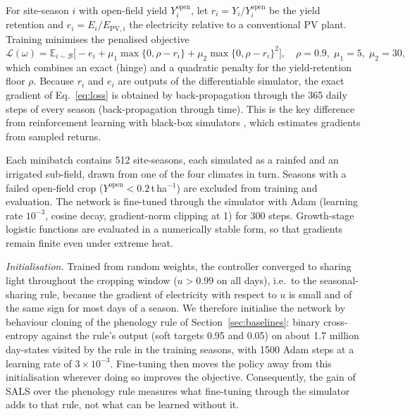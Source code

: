 For site-season $i$ with open-field yield $Y^{\mathrm{open}}_i$, let $r_i=Y_i/Y^{\mathrm{open}}_i$ be the yield retention and $e_i=E_i/E_{\mathrm{PV},i}$ the electricity relative to a conventional PV plant. Training minimises the penalised objective
\begin{equation}
\mathcal{L}(\omega)=\mathbb{E}_{i\sim\mathcal{B}}\Big[-e_i+\mu_1\max\{0,\rho-r_i\}+\mu_2\max\{0,\rho-r_i\}^2\Big],\quad \rho=0.9,\;\mu_1=5,\;\mu_2=30,
\label{eq:loss}
\end{equation}
which combines an exact (hinge) and a quadratic penalty for the yield-retention floor $\rho$. Because $r_i$ and $e_i$ are outputs of the differentiable simulator, the exact gradient of Eq.~\eqref{eq:loss} is obtained by back-propagation through the 365 daily steps of every season (back-propagation through time). This is the key difference from reinforcement learning with black-box simulators \citep{gautron2022}, which estimates gradients from sampled returns.

Each minibatch contains 512 site-seasons, each simulated as a rainfed and an irrigated sub-field, drawn from one of the four climates in turn. Seasons with a failed open-field crop ($Y^{\mathrm{open}}<0.2$\,t\,ha$^{-1}$) are excluded from training and evaluation. The network is fine-tuned through the simulator with Adam \citep{kingma2015} (learning rate $10^{-3}$, cosine decay, gradient-norm clipping at 1) for 300 steps. Growth-stage logistic functions are evaluated in a numerically stable form, so that gradients remain finite even under extreme heat.

\emph{Initialisation.} Trained from random weights, the controller converged to sharing light throughout the cropping window ($u>0.99$ on all days), i.e.\ to the seasonal-sharing rule, because the gradient of electricity with respect to $u$ is small and of the same sign for most days of a season. We therefore initialise the network by behaviour cloning of the phenology rule of Section~\ref{sec:baselines}: binary cross-entropy against the rule's output (soft targets 0.95 and 0.05) on about 1.7 million day-states visited by the rule in the training seasons, with 1500 Adam steps at a learning rate of $3\times10^{-3}$. Fine-tuning then moves the policy away from this initialisation wherever doing so improves the objective. Consequently, the gain of SALS over the phenology rule measures what fine-tuning through the simulator adds to that rule, not what can be learned without it.

